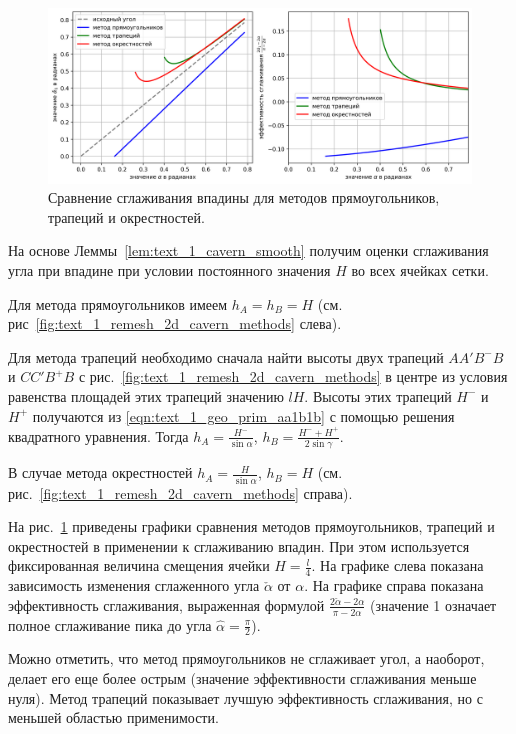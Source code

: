 \begin{figure}[ht]
\centering
\includegraphics[width=1.0\textwidth]{fig/2dr_cavern_methods_chart.png}
\singlespacing
{}\caption{Сравнение сглаживания впадины для методов прямоугольников, трапеций и окрестностей.}
\label{fig:text_1_remesh_2d_cavern_methods_chart}
\end{figure}

На основе Леммы~\ref{lem:text_1_cavern_smooth} получим оценки сглаживания угла при впадине при условии постоянного значения $H$ во всех ячейках сетки.

Для метода прямоугольников имеем $h_A = h_B = H$ (см. рис~\ref{fig:text_1_remesh_2d_cavern_methods} слева).

Для метода трапеций необходимо сначала найти высоты двух трапеций $AA'B^{-}B$ и $CC'B^{+}B$ с рис.~\ref{fig:text_1_remesh_2d_cavern_methods} в центре из условия равенства площадей этих трапеций значению $lH$.
Высоты этих трапеций $H^{-}$ и $H^{+}$ получаются из \eqref{eqn:text_1_geo_prim_aa1b1b} с помощью решения квадратного уравнения.
Тогда $h_A = \frac{H^{-}}{\sin \alpha}$, $h_B = \frac{H^{-} + H^{+}}{2 \sin \gamma}$.

В случае метода окрестностей $h_A = \frac{H}{\sin \alpha}$,  $h_B = H$ (см. рис.~\ref{fig:text_1_remesh_2d_cavern_methods} справа).

На рис.~\ref{fig:text_1_remesh_2d_cavern_methods_chart} приведены графики сравнения методов прямоугольников, трапеций и окрестностей в применении к сглаживанию впадин.
При этом используется фиксированная величина смещения ячейки $H = \frac{l}{4}$.
На графике слева показана зависимость изменения сглаженного угла $\check{\alpha}$ от $\alpha$.
На графике справа показана эффективность сглаживания, выраженная формулой $\frac{2 \check{\alpha} - 2 \alpha}{\pi - 2 \alpha}$ (значение 1 означает полное сглаживание пика до угла $\hat{\alpha} = \frac{\pi}{2}$).

Можно отметить, что метод прямоугольников не сглаживает угол, а наоборот, делает его еще более острым (значение эффективности сглаживания меньше нуля).
Метод трапеций показывает лучшую эффективность сглаживания, но с меньшей областью применимости.

